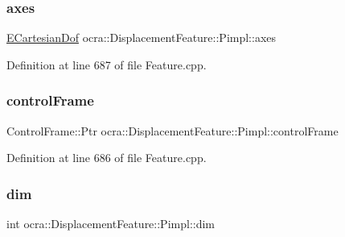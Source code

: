 \hypertarget{structocra_1_1DisplacementFeature_1_1Pimpl_a8c3adba9fb891dac9c158ceb4fad62ea}{}\label{structocra_1_1DisplacementFeature_1_1Pimpl_a8c3adba9fb891dac9c158ceb4fad62ea} 
\subsubsection{\texorpdfstring{axes}{axes}}
{\footnotesize\ttfamily \hyperlink{namespaceocra_a436781c7059a0f76027df1c652126260}{E\+Cartesian\+Dof} ocra\+::\+Displacement\+Feature\+::\+Pimpl\+::axes}



Definition at line 687 of file Feature.\+cpp.

\hypertarget{structocra_1_1DisplacementFeature_1_1Pimpl_a7bf1e93fdc7fe08d51a844161f565223}{}\label{structocra_1_1DisplacementFeature_1_1Pimpl_a7bf1e93fdc7fe08d51a844161f565223} 
\subsubsection{\texorpdfstring{control\+Frame}{controlFrame}}
{\footnotesize\ttfamily Control\+Frame\+::\+Ptr ocra\+::\+Displacement\+Feature\+::\+Pimpl\+::control\+Frame}



Definition at line 686 of file Feature.\+cpp.

\hypertarget{structocra_1_1DisplacementFeature_1_1Pimpl_a1d9edf50ee4d19d01b71ae2e871519b6}{}\label{structocra_1_1DisplacementFeature_1_1Pimpl_a1d9edf50ee4d19d01b71ae2e871519b6} 
\subsubsection{\texorpdfstring{dim}{dim}}
{\footnotesize\ttfamily int ocra\+::\+Displacement\+Feature\+::\+Pimpl\+::dim}



